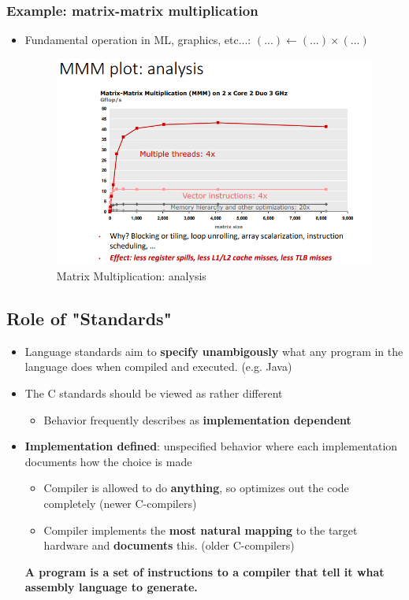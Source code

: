 \documentclass[a4paper,10pt]{article}
\begin{document}
\subsubsection{Example: matrix-matrix multiplication}
\begin{itemize}
    \item Fundamental operation in ML, graphics, etc...: $(...)\leftarrow(...)\times(...)$\\
    \begin{figure}[htp]
        \centering
        \includegraphics[width=11cm]{e2.png}
        \caption{Matrix Multiplication: analysis}
        \label{fig:enter-label}
    \end{figure}
\end{itemize}
\subsection{Role of "Standards"}
\begin{itemize}
    \item Language standards aim to \textbf{specify unambigously} what any program
in the language does when compiled and executed. (e.g. Java)
    \item The C standards should be viewed as rather different
    \begin{itemize}
        \item Behavior frequently describes as \textbf{implementation dependent}
    \end{itemize}
    \item \textbf{Implementation defined}: unspecified behavior where each implementation documents how the choice is made
    \begin{itemize}
        \item Compiler is allowed to do \textbf{anything}, so optimizes out the code completely (newer C-compilers)
        \item Compiler implements the \textbf{most natural mapping} to the target hardware and \textbf{documents} this. (older C-compilers)
    \end{itemize}
    \textbf{A program is a set of instructions to a compiler that tell it what assembly language to generate.}
\end{itemize}
\end{document}
